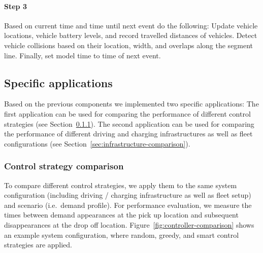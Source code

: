 \documentclass[a4paper,twoside]{article}
\begin{document}
	\paragraph{Step 3}
	
	Based on current time and time until next event do the following:
	Update vehicle locations, vehicle battery levels, and record travelled distances of vehicles.
	Detect vehicle collisions based on their location, width, and overlaps along the segment line.
	Finally, set model time to time of next event.
	
	\subsection{Specific applications}
	\label{sec:application}
	
	Based on the previous components we implemented two specific applications:
	The first application can be used for comparing the performance of different control strategies (see Section~\ref{sec:controller-comparison}).
	The second application can be used for comparing the performance of different driving and charging infrastructures as well as fleet configurations (see Section~\ref{sec:infrastructure-comparison}).
	
	\subsubsection{Control strategy comparison}
	\label{sec:controller-comparison}
	
	To compare different control strategies, we apply them to the same system configuration (including driving / charging infrastructure as well as fleet setup) and scenario (i.e.\ demand profile).
	For performance evaluation, we measure the times between demand appearances at the pick up location and subsequent disappearances at the drop off location.
	Figure~\ref{fig:controller-comparison} shows an example system configuration, where random, greedy, and smart control strategies are applied.
\end{document}
